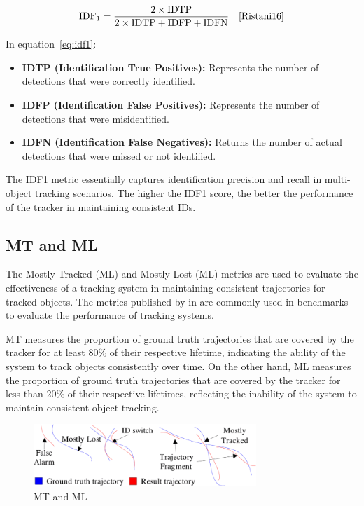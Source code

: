 \begin{equation}
    \label{eq:idf1}
    \text{IDF}_1 = \frac{2 \times \text{IDTP}}{2 \times \text{IDTP} + \text{IDFP} + \text{IDFN}}
    \quad\text{\cite[Eq.~11]{Ristani16}}
\end{equation}

In equation~\ref{eq:idf1}:

\begin{itemize}
    \item \textbf{IDTP (Identification True Positives):} Represents the number of detections that were correctly identified.
    \item \textbf{IDFP (Identification False Positives):} Represents the number of detections that were misidentified.
    \item \textbf{IDFN (Identification False Negatives):} Returns the number of actual detections that were missed or not identified.
\end{itemize}

The IDF1 metric essentially captures identification precision and recall in multi-object tracking scenarios. The higher the IDF1 score, the better the performance of the tracker in maintaining consistent IDs.

\subsection{MT and ML}\label{subsec:mt_ml}
The Mostly Tracked (ML) and Mostly Lost (ML) metrics are used to evaluate the effectiveness of a tracking system in maintaining consistent trajectories for tracked objects. The metrics published by \textcite{Wu06} in \citeyear{Wu06} are commonly used in benchmarks to evaluate the performance of tracking systems.

MT measures the proportion of ground truth trajectories that are covered by the tracker for at least 80\% of their respective lifetime, indicating the ability of the system to track objects consistently over time. On the other hand, ML measures the proportion of ground truth trajectories that are covered by the tracker for less than 20\% of their respective lifetimes, reflecting the inability of the system to maintain consistent object tracking.

\begin{figure}[ht]
    \centering
    \includegraphics[width=0.75\textwidth]{resources/fig/Wu06-MT_ML.png}
    \caption{MT and ML~\cite[Fig.~5]{Wu06}}\label{fig:mt_ml}
\end{figure}

